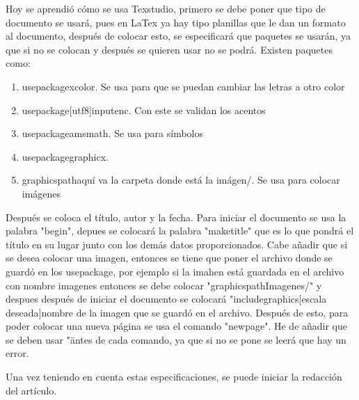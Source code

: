 \documentclass[letterpaper, 12pt,oneside]{article}
\begin{document}
	Hoy se aprendió cómo se usa Texstudio, primero se debe poner que tipo de documento se usará, pues en LaTex ya hay tipo planillas que le dan un formato al documento, después de colocar esto, se especificará que paquetes se usarán, ya que si no se colocan y después se quieren usar no se podrá. Existen paquetes como:
	\begin{enumerate}
		\item
		usepackage{xcolor}. Se usa para que se puedan cambiar las letras a otro color
		\item
		usepackage[utf8]{inputenc}. Con este se validan los acentos
		\item
		usepackage{amsmath}. Se usa para símbolos
		\item
		usepackage{graphicx}. 
		\item
		graphicspath{{aquí va la carpeta donde está la imágen/}}. Se usa para colocar imágenes
	\end{enumerate}
	Después se coloca el título, autor y la fecha. Para iniciar el documento se usa la palabra "begin", depues se colocará la palabra "maketitle" que es lo que pondrá el título en su lugar junto con los demás datos proporcionados. Cabe añadir que si se desea colocar una imagen, entonces se tiene que poner el archivo donde se guardó en los usepackage, por ejemplo si la imahen está guardada en el archivo con nombre imagenes entonces se debe colocar "graphicspath{{Imagenes/}}" y despues después de iniciar el documento se colocará "includegraphics[escala deseada]{nombre de la imagen que se guardó en el archivo}. Después de esto, para poder colocar una nueva página se usa el comando "newpage". He de añadir que se deben usar "\" antes de cada comando, ya que si no se pone se leerá que hay un error. 
	
	Una vez teniendo en cuenta estas especificaciones, se puede iniciar la redacción del artículo. 
\end{document}
